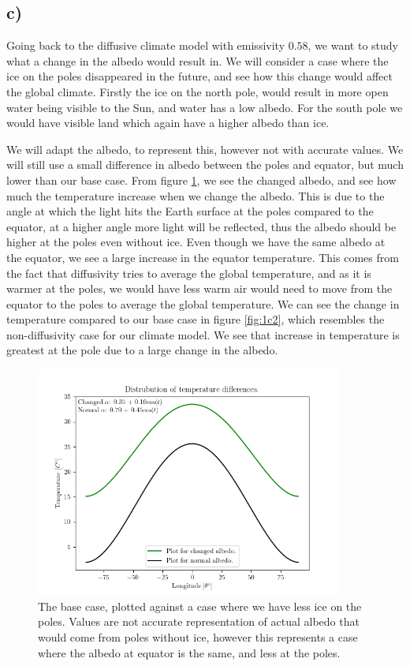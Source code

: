 \documentclass[10pt, a4paper]{amsart}
\begin{document}
\subsection{c)}
Going back to the diffusive climate model with emissivity $0.58$, we want to study what a change in the albedo would result in. We will consider a case where the ice on the poles disappeared in the future, and see how this change would affect the global climate. Firstly the ice on the north pole, would result in more open water being visible to the Sun, and water has a low albedo. For the south pole we would have visible land which again have a higher albedo than ice. 

We will adapt the albedo, to represent this, however not with accurate values. We will still use a small difference in albedo between the poles and equator, but much lower than our base case. From figure \ref{fig:1c1}, we see the changed albedo, and see how much the temperature increase when we change the albedo. This is due to the angle at which the light hits the Earth surface at the poles compared to the equator, at a higher angle more light will be reflected, thus the albedo should be higher at the poles even without ice. 
Even though we have the same albedo at the equator, we see a large increase in the equator temperature. This comes from the fact that diffusivity tries to average the global temperature, and as it is warmer at the poles, we would have less warm air would need to move from the equator to the poles to average the global temperature. We can see the change in temperature compared to our base case in figure \ref{fig:1c2}, which resembles the non-diffusivity case for our climate model. We see that increase in temperature is greatest at the pole due to a large change in the albedo. 

\begin{figure}
	\centering\includegraphics[width=0.9\textwidth]{../code/c1.png}
	\caption{The base case, plotted against a case where we have less ice on the poles. Values are not accurate representation of actual albedo that would come from poles without ice, however this represents a case where the albedo at equator is the same, and less at the poles.}
	\label{fig:1c1}
\end{figure}
\end{document}
